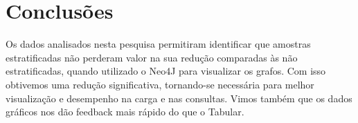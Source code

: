 \section{Conclusões}

Os dados analisados nesta pesquisa permitiram identificar que amostras estratificadas não perderam valor na sua redução comparadas às não estratificadas, quando utilizado o Neo4J para visualizar os grafos. Com isso obtivemos uma redução significativa, tornando-se necessária para melhor visualização e desempenho na carga e nas consultas. Vimos também que os dados gráficos nos dão feedback mais rápido do que o Tabular.